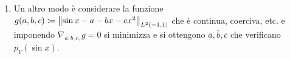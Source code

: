 \begin{enumerate}
\item Un altro modo è considerare la funzione $g(a, b, c) \coloneqq \left\lVert \sin x - a - bx - cx^2 \right\rVert_{L^2(-1, 1)}$ che è continua, coerciva, etc. e imponendo $\nabla_{a,b,c,} g = 0$ si minimizza e si ottengono $\bar a, \bar b, \bar c$ che verificano $p_V(\sin x)$.

\end{enumerate}









